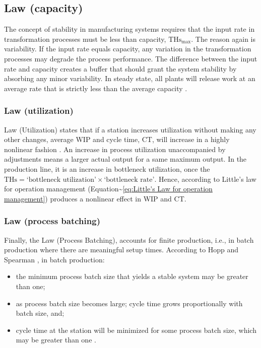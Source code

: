 \documentclass{article}
\begin{document}
\subsection{Law (capacity)}
The concept of stability in manufacturing systems requires that the input rate in transformation processes must be less than capacity, \(\mbox{THs}_{\mbox{max}}\).
The reason again is variability.
If the input rate equals capacity, any variation in the transformation processes may degrade the process performance.
The difference between the input rate and capacity creates a buffer that should grant the system stability by absorbing any minor variability.
In steady state, all plants will release work at an average rate that is strictly less than the average capacity \citep[p.303]{Hopp2001}.

\subsubsection{Law (utilization)}
\label{sec:org8a063a7}

Law (Utilization) states that if a station increases utilization without making any other changes, average WIP and cycle time, CT, will increase in a highly nonlinear fashion \citep[p.303]{Hopp2001}.
An increase in process utilization unaccompanied by adjustments means a larger actual output for a same maximum output.
In the production line, it is an increase in bottleneck utilization, once the \(\mbox{THs} = \mbox{`bottleneck utilization'}\times\mbox{`bottleneck rate'}\).
Hence, according to Little's law for operation management (Equation\textasciitilde{}\ref{eq:Little's Law for operation management}) produces a nonlinear effect in WIP and CT.

\subsubsection{Law (process batching)}
\label{sec:orgfaeb7a6}

Finally, the Law (Process Batching), accounts for finite production, i.e., in batch production where there are meaningful setup times.
According to Hopp and Spearman \cite{Hopp2001}, in batch production:

\begin{itemize}
    \item the minimum process batch size that yields a stable system may be greater than one;
    \item as process batch size becomes large; cycle time grows proportionally with batch size, and;
    \item cycle time at the station will be minimized for some process batch size, which may be greater than one \citep[p.306]{Hopp2001}.
\end{itemize}
\end{document}
